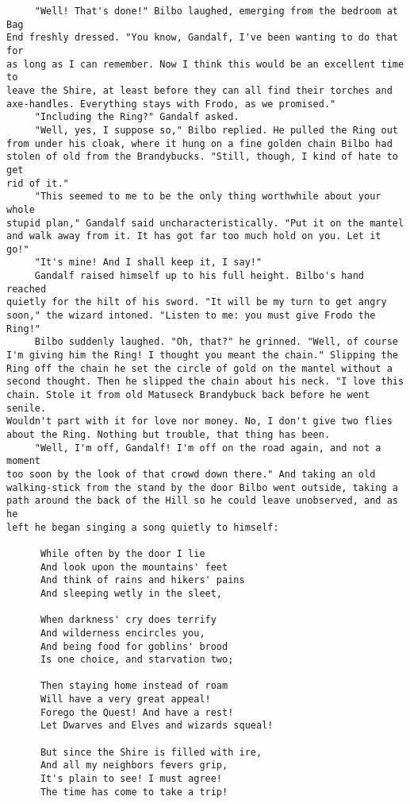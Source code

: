 \begin{verbatim}
     "Well! That's done!" Bilbo laughed, emerging from the bedroom at Bag 
End freshly dressed. "You know, Gandalf, I've been wanting to do that for 
as long as I can remember. Now I think this would be an excellent time to 
leave the Shire, at least before they can all find their torches and 
axe-handles. Everything stays with Frodo, as we promised."
     "Including the Ring?" Gandalf asked.
     "Well, yes, I suppose so," Bilbo replied. He pulled the Ring out 
from under his cloak, where it hung on a fine golden chain Bilbo had 
stolen of old from the Brandybucks. "Still, though, I kind of hate to get 
rid of it."
     "This seemed to me to be the only thing worthwhile about your whole 
stupid plan," Gandalf said uncharacteristically. "Put it on the mantel 
and walk away from it. It has got far too much hold on you. Let it go!"
     "It's mine! And I shall keep it, I say!"
     Gandalf raised himself up to his full height. Bilbo's hand reached 
quietly for the hilt of his sword. "It will be my turn to get angry 
soon," the wizard intoned. "Listen to me: you must give Frodo the Ring!"
     Bilbo suddenly laughed. "Oh, that?" he grinned. "Well, of course 
I'm giving him the Ring! I thought you meant the chain." Slipping the 
Ring off the chain he set the circle of gold on the mantel without a 
second thought. Then he slipped the chain about his neck. "I love this 
chain. Stole it from old Matuseck Brandybuck back before he went senile. 
Wouldn't part with it for love nor money. No, I don't give two flies 
about the Ring. Nothing but trouble, that thing has been.
     "Well, I'm off, Gandalf! I'm off on the road again, and not a moment 
too soon by the look of that crowd down there." And taking an old 
walking-stick from the stand by the door Bilbo went outside, taking a 
path around the back of the Hill so he could leave unobserved, and as he 
left he began singing a song quietly to himself:

      While often by the door I lie
      And look upon the mountains' feet
      And think of rains and hikers' pains
      And sleeping wetly in the sleet,

      When darkness' cry does terrify
      And wilderness encircles you,
      And being food for goblins' brood
      Is one choice, and starvation two;

      Then staying home instead of roam
      Will have a very great appeal!
      Forego the Quest! And have a rest!
      Let Dwarves and Elves and wizards squeal!

      But since the Shire is filled with ire,
      And all my neighbors fevers grip,
      It's plain to see! I must agree!
      The time has come to take a trip!


\end{verbatim}
